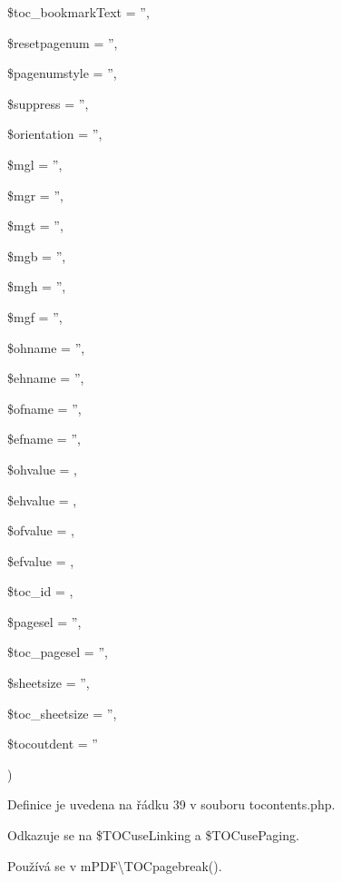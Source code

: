 {{\begin{DoxyParamCaption}
\item[{}]{\$toc\-\_\-bookmark\-Text = {\ttfamily ''}, }
\item[{}]{\$resetpagenum = {\ttfamily ''}, }
\item[{}]{\$pagenumstyle = {\ttfamily ''}, }
\item[{}]{\$suppress = {\ttfamily ''}, }
\item[{}]{\$orientation = {\ttfamily ''}, }
\item[{}]{\$mgl = {\ttfamily ''}, }
\item[{}]{\$mgr = {\ttfamily ''}, }
\item[{}]{\$mgt = {\ttfamily ''}, }
\item[{}]{\$mgb = {\ttfamily ''}, }
\item[{}]{\$mgh = {\ttfamily ''}, }
\item[{}]{\$mgf = {\ttfamily ''}, }
\item[{}]{\$ohname = {\ttfamily ''}, }
\item[{}]{\$ehname = {\ttfamily ''}, }
\item[{}]{\$ofname = {\ttfamily ''}, }
\item[{}]{\$efname = {\ttfamily ''}, }
\item[{}]{\$ohvalue = {}, }
\item[{}]{\$ehvalue = {}, }
\item[{}]{\$ofvalue = {}, }
\item[{}]{\$efvalue = {}, }
\item[{}]{\$toc\-\_\-id = {}, }
\item[{}]{\$pagesel = {\ttfamily ''}, }
\item[{}]{\$toc\-\_\-pagesel = {\ttfamily ''}, }
\item[{}]{\$sheetsize = {\ttfamily ''}, }
\item[{}]{\$toc\-\_\-sheetsize = {\ttfamily ''}, }
\item[{}]{\$tocoutdent = {\ttfamily ''}}
\end{DoxyParamCaption}
)}}\label{classtocontents_ad3509c4d89dee63947f014b7c4abd750}


Definice je uvedena na řádku 39 v souboru tocontents.\-php.



Odkazuje se na \$\-T\-O\-Cuse\-Linking a \$\-T\-O\-Cuse\-Paging.



Používá se v m\-P\-D\-F\textbackslash{}\-T\-O\-Cpagebreak().



